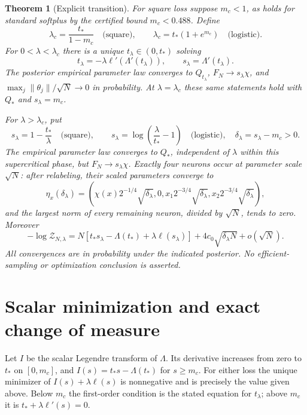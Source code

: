 \documentclass[11pt]{article}
\newtheorem{theorem}{Theorem}\newtheorem{proposition}[theorem]{Proposition}
\begin{document}
\begin{theorem}[Explicit transition]
For square loss suppose $m_c<1$, as holds for standard softplus by
the certified bound $m_c<0.488$. Define
\[
 \lambda_c=\frac{t_*}{1-m_c}\quad\text{(square)},\qquad
 \lambda_c=t_*(1+e^{m_c})\quad\text{(logistic)}.                 \tag{2}
\]
For $0<\lambda<\lambda_c$ there is a unique $t_\lambda\in(0,t_*)$
solving
\[
 t_\lambda=-\lambda\ell'(\Lambda'(t_\lambda)),\qquad
 s_\lambda=\Lambda'(t_\lambda).
\]
The posterior empirical parameter law converges to $Q_{t_\lambda}$,
$F_N\to s_\lambda\chi$, and
$\max_j\|\theta_j\|/\sqrt N\to0$ in probability.
At $\lambda=\lambda_c$ these same statements hold with $Q_*$ and
$s_\lambda=m_c$.

For $\lambda>\lambda_c$, put
\[
 s_\lambda=1-\frac{t_*}{\lambda}\quad\text{(square)},\qquad
 s_\lambda=\log\left(\frac\lambda{t_*}-1\right)
                   \quad\text{(logistic)},\quad
 \delta_\lambda=s_\lambda-m_c>0.                             \tag{3}
\]
The empirical parameter law converges to $Q_*$, independent of
$\lambda$ within this supercritical phase, but
$F_N\to s_\lambda\chi$. Exactly four neurons occur at parameter
scale $\sqrt N$: after relabeling, their scaled parameters converge to
\[
 \eta_x(\delta_\lambda)=
 \left(\chi(x)2^{-1/4}\sqrt{\delta_\lambda},0,
       x_1 2^{-3/4}\sqrt{\delta_\lambda},
       x_2 2^{-3/4}\sqrt{\delta_\lambda}\right),               \tag{4}
\]
and the largest norm of every remaining neuron, divided by $\sqrt N$,
tends to zero. Moreover
\[
 -\log\mathcal Z_{N,\lambda}
  =N\left[t_*s_\lambda-\Lambda(t_*)+
                          \lambda\ell(s_\lambda)\right]
    +4c_0\sqrt{\delta_\lambda N}+o(\sqrt N).                  \tag{5}
\]
All convergences are in probability under the indicated posterior.
No efficient-sampling or optimization conclusion is asserted.
\end{theorem}

\section{Scalar minimization and exact change of measure}
Let $I$ be the scalar Legendre transform of $\Lambda$.
Its derivative increases from zero to $t_*$ on $[0,m_c]$, and
$I(s)=t_*s-\Lambda(t_*)$ for $s\ge m_c$.
For either loss the unique minimizer of $I(s)+\lambda\ell(s)$ is
nonnegative and is precisely the value given above. Below $m_c$
the first-order condition is the stated equation for $t_\lambda$;
above $m_c$ it is $t_*+\lambda\ell'(s)=0$.
\end{document}
